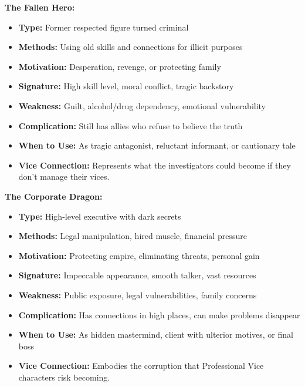 \documentclass[11pt]{article}
\begin{document}
\textbf{The Fallen Hero:}
\begin{itemize}
    \item \textbf{Type:} Former respected figure turned criminal
    \item \textbf{Methods:} Using old skills and connections for illicit purposes
    \item \textbf{Motivation:} Desperation, revenge, or protecting family
    \item \textbf{Signature:} High skill level, moral conflict, tragic backstory
    \item \textbf{Weakness:} Guilt, alcohol/drug dependency, emotional vulnerability
    \item \textbf{Complication:} Still has allies who refuse to believe the truth
    \item \textbf{When to Use:} As tragic antagonist, reluctant informant, or cautionary tale
    \item \textbf{Vice Connection:} Represents what the investigators could become if they don't manage their vices.
\end{itemize}

\textbf{The Corporate Dragon:}
\begin{itemize}
    \item \textbf{Type:} High-level executive with dark secrets
    \item \textbf{Methods:} Legal manipulation, hired muscle, financial pressure
    \item \textbf{Motivation:} Protecting empire, eliminating threats, personal gain
    \item \textbf{Signature:} Impeccable appearance, smooth talker, vast resources
    \item \textbf{Weakness:} Public exposure, legal vulnerabilities, family concerns
    \item \textbf{Complication:} Has connections in high places, can make problems disappear
    \item \textbf{When to Use:} As hidden mastermind, client with ulterior motives, or final boss
    \item \textbf{Vice Connection:} Embodies the corruption that Professional Vice characters risk becoming.
\end{itemize}
\end{document}
